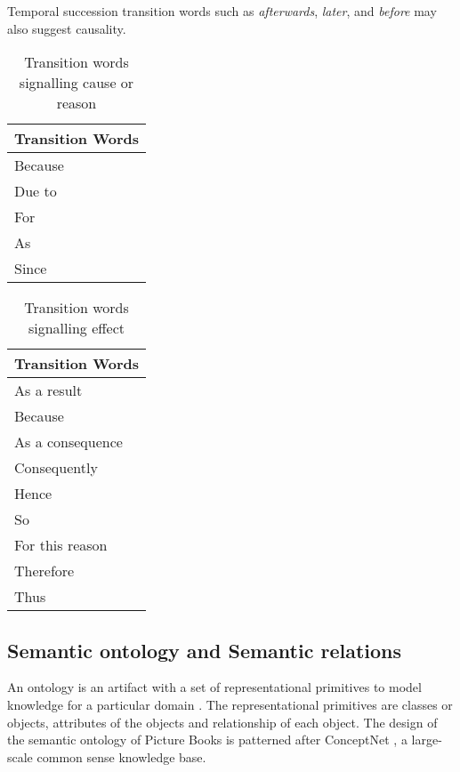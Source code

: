 Temporal succession transition words such as \textit{afterwards}, \textit{later}, and \textit{before} may also suggest causality.

\begin{table}[ht]   %
\centering
\caption{Transition words signalling cause or reason} \vspace{0.25em}
\begin{tabular}{|l|} \hline
Transition Words \\ \hline
Because \\
Due to \\
For \\
As \\
Since \\ \hline
\end{tabular}
\label{tab:transitionscause}
\end{table}

\begin{table}[ht]   %
\centering
\caption{Transition words signalling effect} \vspace{0.25em}
\begin{tabular}{|l|} \hline
Transition Words \\ \hline
As a result \\
Because \\
As a consequence \\
Consequently \\
Hence \\
So \\
For this reason \\
Therefore \\
Thus \\ \hline
\end{tabular}
\label{tab:transitionseffect}
\end{table}

\subsection{Semantic ontology and Semantic relations}
\label{sec:semanticontology}

An ontology is an artifact with a set of representational primitives to model knowledge for a particular domain \cite{Gruber:2008}. The representational primitives are classes or objects, attributes of the objects and relationship of each object. The design of the semantic ontology of Picture Books is patterned after ConceptNet \cite{Liu:2004a}, a large-scale common sense knowledge base. 

